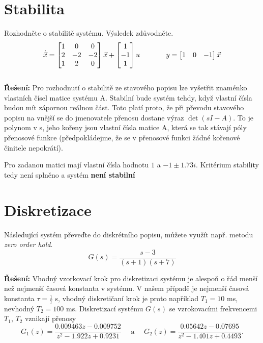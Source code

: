 \documentclass[twoside]{article}
\begin{document}
\section{Stabilita}
\label{sec:ukol6}
Rozhodněte o stabilitě systému. Výsledek zdůvodněte. \\
\begin{equation*}
	\centering
	\dot{\vec{x}} = \begin{bmatrix}
		1 & 0 & 0 \\
		2 & -2 & -2 \\
		1 & 2 & 0
	\end{bmatrix} \vec{x} + \begin{bmatrix}
		1 \\
		-1 \\
		1
\end{bmatrix} u ~~~~~~~~~~~
y = \begin{bmatrix}
	1 & 0 & -1
\end{bmatrix} \vec{x}
\end{equation*} \\
\textbf{Řešení:} Pro rozhodnutí o stabilitě ze stavového popisu lze vyšetřit znaménko vlastních čísel matice systému A.
Stabilní bude systém tehdy, když vlastní čísla budou mít zápornou reálnou část. Toto platí proto, že při převodu
stavového popisu na vnější se do jmenovatele přenosu dostane výraz $\det(sI - A)$. To je polynom v s, jeho kořeny
jsou vlastní čísla matice A, která se tak stávají póly přenosové funkce (předpokládejme, že se v přenosové funkci žádné kořenové činitele nepokrátí).

Pro zadanou matici mají vlastní čísla hodnotu $1$ a $ -1 \pm 1.73 i$. Kritérium stability tedy není splněno a systém \textbf{není stabilní} 


\section{Diskretizace}
\label{sec:ukol7}
Následující systém převeďte do diskrétního popisu, můžete využít např. metodu \textit{zero order hold}.
\begin{equation}
	G(s) = \frac{s-3}{(s+1)(s+7)}
\end{equation}

\textbf{Řešení:} Vhodný vzorkovací krok pro diskretizaci systému je alespoň o řád menší než nejmenší časová konstanta v systému.
V našem případě je nejmenší časová konstanta $\tau = \frac{1}{7}$ s, vhodný diskretičaní krok je proto například $T_1 = 10$ ms, nevhodný $T_2 = 100$ ms.
Diskretizací systému $G(s)$ se vzrokovacími frekvencemi $T_1$, $T_2$ vznikají přenosy
\begin{equation*}
	G_1(z) = \frac{0.009463z - 0.009752}{z^2 - 1.922z+0.9231} ~~~~~~\text{a}~~~~~~ G_2(z) = \frac{0.05642z - 0.07695}{z^2 - 1.401z+0.4493}.
\end{equation*}
\end{document}
